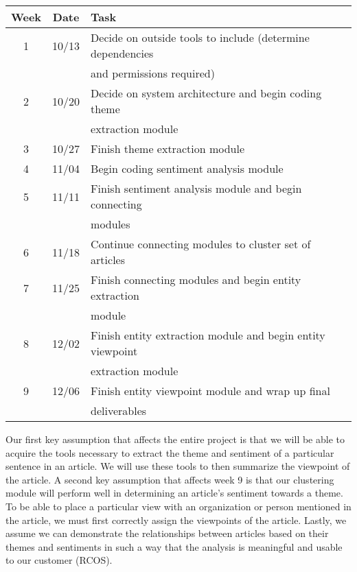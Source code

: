 \documentclass[12pt]{article}
\begin{document}
\begin{tabular}{|c|c|l|}\hline
Week & Date & Task\\\hline
1 & 10/13 & Decide on outside tools to include (determine dependencies\\
  &       & and permissions required)\\\hline
2 & 10/20 & Decide on system architecture and begin coding theme\\
  &       & extraction module\\\hline
3 & 10/27 & Finish theme extraction module\\\hline
4 & 11/04 & Begin coding sentiment analysis module\\\hline
5 & 11/11 & Finish sentiment analysis module and begin connecting\\
  &       & modules\\\hline
6 & 11/18 & Continue connecting modules to cluster set of articles\\\hline
7 & 11/25 & Finish connecting modules and begin entity extraction\\
  &       & module\\\hline
8 & 12/02 & Finish entity extraction module and begin entity viewpoint\\
  &       & extraction module\\\hline
9 & 12/06 & Finish entity viewpoint module and wrap up final\\
  &       & deliverables\\\hline
\end{tabular}

\vspace{.2in}
Our first key assumption that affects the entire project is that we will be able to acquire the tools necessary to extract the theme and sentiment of a particular sentence in an article. We will use these tools to then summarize the viewpoint of the article. A second key assumption that affects week 9 is that our clustering module will perform well in determining an article's sentiment towards a theme. To be able to place a particular view with an organization or person mentioned in the article, we must first correctly assign the viewpoints of the article. Lastly, we assume we can demonstrate the relationships between articles based on their themes and sentiments in such a way that the analysis is meaningful and usable to our customer (RCOS).
\end{document}
